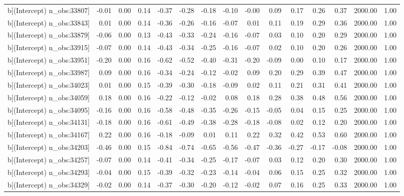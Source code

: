 \begin{table}[ht]
\begin{tabular}{rrrrrrrrrrrrrrr}
  b[(Intercept) n\_obs:33807] & -0.01 & 0.00 & 0.14 & -0.37 & -0.28 & -0.18 & -0.10 & -0.00 & 0.09 & 0.17 & 0.26 & 0.37 & 2000.00 & 1.00 \\ 
  b[(Intercept) n\_obs:33843] & 0.01 & 0.00 & 0.14 & -0.36 & -0.26 & -0.16 & -0.07 & 0.01 & 0.11 & 0.19 & 0.29 & 0.36 & 2000.00 & 1.00 \\ 
  b[(Intercept) n\_obs:33879] & -0.06 & 0.00 & 0.13 & -0.43 & -0.33 & -0.24 & -0.16 & -0.07 & 0.03 & 0.10 & 0.20 & 0.29 & 2000.00 & 1.00 \\ 
  b[(Intercept) n\_obs:33915] & -0.07 & 0.00 & 0.14 & -0.43 & -0.34 & -0.25 & -0.16 & -0.07 & 0.02 & 0.10 & 0.20 & 0.26 & 2000.00 & 1.00 \\ 
  b[(Intercept) n\_obs:33951] & -0.20 & 0.00 & 0.16 & -0.62 & -0.52 & -0.40 & -0.31 & -0.20 & -0.09 & 0.00 & 0.10 & 0.17 & 2000.00 & 1.00 \\ 
  b[(Intercept) n\_obs:33987] & 0.09 & 0.00 & 0.16 & -0.34 & -0.24 & -0.12 & -0.02 & 0.09 & 0.20 & 0.29 & 0.39 & 0.47 & 2000.00 & 1.00 \\ 
  b[(Intercept) n\_obs:34023] & 0.01 & 0.00 & 0.15 & -0.39 & -0.30 & -0.18 & -0.09 & 0.02 & 0.11 & 0.21 & 0.31 & 0.41 & 2000.00 & 1.00 \\ 
  b[(Intercept) n\_obs:34059] & 0.18 & 0.00 & 0.16 & -0.22 & -0.12 & -0.02 & 0.08 & 0.18 & 0.28 & 0.38 & 0.48 & 0.56 & 2000.00 & 1.00 \\ 
  b[(Intercept) n\_obs:34095] & -0.16 & 0.00 & 0.16 & -0.58 & -0.48 & -0.35 & -0.26 & -0.15 & -0.05 & 0.04 & 0.15 & 0.25 & 2000.00 & 1.00 \\ 
  b[(Intercept) n\_obs:34131] & -0.18 & 0.00 & 0.16 & -0.61 & -0.49 & -0.38 & -0.28 & -0.18 & -0.08 & 0.02 & 0.12 & 0.20 & 2000.00 & 1.00 \\ 
  b[(Intercept) n\_obs:34167] & 0.22 & 0.00 & 0.16 & -0.18 & -0.09 & 0.01 & 0.11 & 0.22 & 0.32 & 0.42 & 0.53 & 0.60 & 2000.00 & 1.00 \\ 
  b[(Intercept) n\_obs:34203] & -0.46 & 0.00 & 0.15 & -0.84 & -0.74 & -0.65 & -0.56 & -0.47 & -0.36 & -0.27 & -0.17 & -0.08 & 2000.00 & 1.00 \\ 
  b[(Intercept) n\_obs:34257] & -0.07 & 0.00 & 0.14 & -0.41 & -0.34 & -0.25 & -0.17 & -0.07 & 0.03 & 0.12 & 0.20 & 0.30 & 2000.00 & 1.00 \\ 
  b[(Intercept) n\_obs:34293] & -0.04 & 0.00 & 0.15 & -0.39 & -0.32 & -0.23 & -0.14 & -0.04 & 0.06 & 0.15 & 0.25 & 0.32 & 2000.00 & 1.00 \\ 
  b[(Intercept) n\_obs:34329] & -0.02 & 0.00 & 0.14 & -0.37 & -0.30 & -0.20 & -0.12 & -0.02 & 0.07 & 0.16 & 0.25 & 0.33 & 2000.00 & 1.00 \\ 

\end{tabular}
\end{table}

